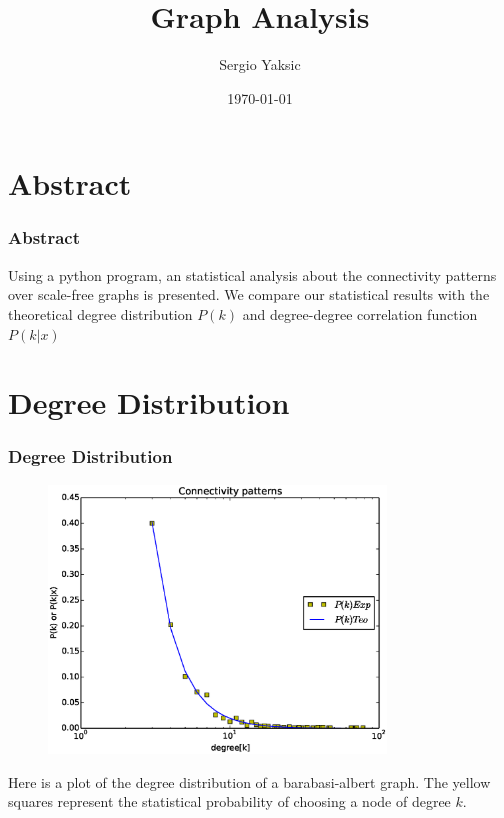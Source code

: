 \documentclass{beamer}
\begin{document}
	\title{Graph Analysis}

\author{Sergio Yaksic}

\date{\today}


\begin{frame}
\titlepage
\end{frame}
	

\section{Abstract}


\begin{frame}\frametitle{Abstract}

Using a python program, an statistical analysis about the connectivity patterns over scale-free graphs is presented. 
We compare our statistical results with the theoretical degree distribution $P(k)$ and degree-degree correlation function $P(k|x)$ 

\end{frame}
	

\section{Degree Distribution}


\begin{frame}\frametitle{Degree Distribution}

\begin{figure}[hbt!]
\includegraphics[width=0.8\textwidth]{./temp/exp/results/Image01.eps}

\end{figure}


Here is a plot of the degree distribution of a barabasi-albert graph. The yellow squares represent the statistical probability of choosing a node of degree $k$.

\end{frame}
	
\end{document}
